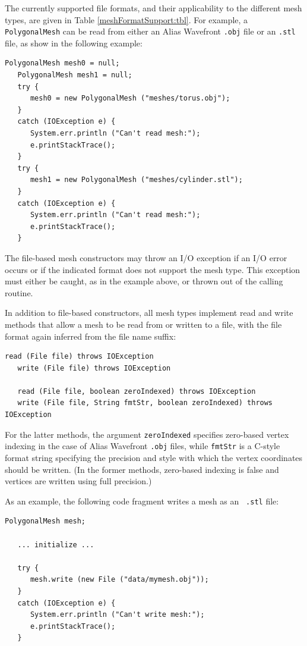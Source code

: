 The currently supported file formats, and their applicability to the
different mesh types, are given in Table
\ref{meshFormatSupport:tbl}.
For example, a {\tt PolygonalMesh} can be read from either an Alias
Wavefront {\tt .obj} file or an {\tt .stl} file, as show in the
following example:
%
\begin{lstlisting}[]
   PolygonalMesh mesh0 = null;
   PolygonalMesh mesh1 = null;
   try {
      mesh0 = new PolygonalMesh ("meshes/torus.obj");
   }
   catch (IOException e) {
      System.err.println ("Can't read mesh:");
      e.printStackTrace();
   }
   try {
      mesh1 = new PolygonalMesh ("meshes/cylinder.stl");
   }
   catch (IOException e) {
      System.err.println ("Can't read mesh:");
      e.printStackTrace();
   }
\end{lstlisting}
%
The file-based mesh constructors may throw an I/O exception if an I/O
error occurs or if the indicated format does not support the mesh
type. This exception must either be caught, as in the example above,
or thrown out of the calling routine.

In addition to file-based constructors, all mesh types implement read
and write methods that allow a mesh to be read from or written to a
file, with the file format again inferred from the file name suffix:
%
\begin{lstlisting}[]
   read (File file) throws IOException
   write (File file) throws IOException

   read (File file, boolean zeroIndexed) throws IOException
   write (File file, String fmtStr, boolean zeroIndexed) throws IOException
\end{lstlisting}
%
For the latter methods, the argument {\tt zeroIndexed} specifies
zero-based vertex indexing in the case of Alias Wavefront {\tt .obj}
files, while {\tt fmtStr} is a C-style format string specifying the
precision and style with which the vertex coordinates should be
written. (In the former methods, zero-based indexing is false and
vertices are written using full precision.)

As an example, the following code fragment writes a mesh as an {\tt
.stl} file:
%
\begin{lstlisting}[]
   PolygonalMesh mesh;

   ... initialize ...

   try {
      mesh.write (new File ("data/mymesh.obj"));
   }
   catch (IOException e) {
      System.err.println ("Can't write mesh:");
      e.printStackTrace();
   }
\end{lstlisting}
%

